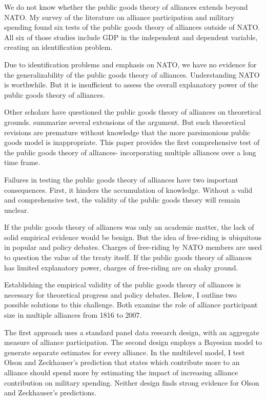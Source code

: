 \documentclass[12pt]{article}
\begin{document}
We do not know whether the public goods theory of alliances extends beyond NATO. 
My survey of the literature on alliance participation and military spending found six tests of the public goods theory of alliances outside of NATO. 
All six of those studies include GDP in the independent and dependent variable, creating an identification problem. 


Due to identification problems and emphasis on NATO, we have no evidence for the generalizability of the public goods theory of alliances. 
Understanding NATO is worthwhile. 
But it is insufficient to assess the overall explanatory power of the public goods theory of alliances. 


Other scholars have questioned the public goods theory of alliances on theoretical grounds.  
\citet{SandlerHartley2001} summarize several extensions of the argument.  
But such theoretical revisions are premature without knowledge that the more parsimonious public goods model is inappropriate. 
This paper provides the first comprehensive test of the public goods theory of alliances- incorporating multiple alliances over a long time frame. 


Failures in testing the public goods theory of alliances have two important consequences. 
First, it hinders the accumulation of knowledge. 
Without a valid and comprehensive test, the validity of the public goods theory will remain unclear. 


If the public goods theory of alliances was only an academic matter, the lack of solid empirical evidence would be benign. 
But the idea of free-riding is ubiquitous in popular and policy debates. 
Charges of free-riding by NATO members are used to question the value of the treaty itself. 
If the public goods theory of alliances has limited explanatory power, charges of free-riding are on shaky ground. 


Establishing the empirical validity of the public goods theory of alliances is necessary for theoretical progress and policy debates. 
Below, I outline two possible solutions to this challenge. 
Both examine the role of alliance participant size in multiple alliances from 1816 to 2007. 


The first approach uses a standard panel data research design, with an aggregate measure of alliance participation. 
The second design employs a Bayesian model to generate separate estimates for every alliance. 
In the multilevel model, I test Olson and Zeckhauser's prediction that states which contribute more to an alliance should spend more by estimating the impact of increasing alliance contribution on military spending. 
Neither design finds strong evidence for Olson and Zeckhauser's predictions. 
\end{document}
